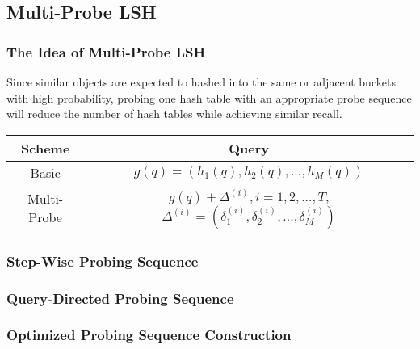 \subsection{Multi-Probe LSH}
\begin{frame}
\frametitle{The Idea of Multi-Probe LSH}
	Since similar objects are expected to hashed into the same or adjacent buckets with high probability, probing one hash table with an appropriate probe sequence will reduce the number of hash tables while achieving similar recall.

\begin{table}
\begin{tabular}{|c|c|}
\hline
  \textbf{Scheme} & \textbf{Query}\\ \hline
  Basic& $g(q)=(h_1(q), h_2(q), ..., h_M(q))$ \\ \hline
  Multi-Probe& $g(q){+}\Delta^{(i)}, i{=}1,2,...,T$, $\Delta^{(i)}{=}(\delta_1^{(i)}, \delta_2^{(i)}, ..., \delta_M^{(i)})$ \\ \hline
\end{tabular}
\end{table}

\end{frame}

\begin{frame}
	\frametitle{Step-Wise Probing Sequence}
\end{frame}

\begin{frame}
	\frametitle{Query-Directed Probing Sequence}
\end{frame}

\begin{frame}
	\frametitle{Optimized Probing Sequence Construction}
\end{frame}
